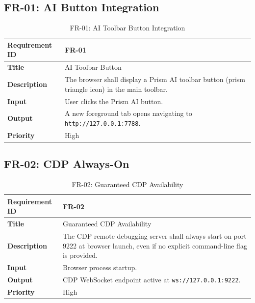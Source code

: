 \subsection{FR-01: AI Button Integration}
\begin{table}[H]
\centering
\caption{FR-01: AI Toolbar Button Integration}
\begin{tabular}{|p{4cm}|p{10cm}|}
\hline
\textbf{Requirement ID} & FR-01 \\ \hline
\textbf{Title} & AI Toolbar Button \\ \hline
\textbf{Description} & The browser shall display a Prism AI toolbar button (prism triangle icon) in the main toolbar. \\ \hline
\textbf{Input} & User clicks the Prism AI button. \\ \hline
\textbf{Output} & A new foreground tab opens navigating to \texttt{http://127.0.0.1:7788}. \\ \hline
\textbf{Priority} & High \\ \hline
\end{tabular}
\end{table}

\needspace{7cm}
\subsection{FR-02: CDP Always-On}
\begin{table}[H]
\centering
\caption{FR-02: Guaranteed CDP Availability}
\begin{tabular}{|p{4cm}|p{10cm}|}
\hline
\textbf{Requirement ID} & FR-02 \\ \hline
\textbf{Title} & Guaranteed CDP Availability \\ \hline
\textbf{Description} & The CDP remote debugging server shall always start on port 9222 at browser launch, even if no explicit command-line flag is provided. \\ \hline
\textbf{Input} & Browser process startup. \\ \hline
\textbf{Output} & CDP WebSocket endpoint active at \texttt{ws://127.0.0.1:9222}. \\ \hline
\textbf{Priority} & High \\ \hline
\end{tabular}
\end{table}

\needspace{7cm}
